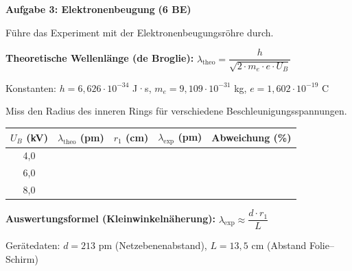 \documentclass[11pt,a4paper]{article}
\begin{document}
\vspace{0.5em}


{\large\textbf{Aufgabe 3: Elektronenbeugung}} \hfill \textbf{(6 BE)}

\vspace{0.5em}

Führe das Experiment mit der Elektronenbeugungsröhre durch.

\vspace{0.5em}

\begin{tcolorbox}[formelbox]
\textbf{Theoretische Wellenlänge (de Broglie):} \quad $\lambda_{\text{theo}} = \dfrac{h}{\sqrt{2 \cdot m_e \cdot e \cdot U_B}}$

\vspace{0.3em}
{\small Konstanten: $h = 6{,}626 \cdot 10^{-34}$ J·s, $m_e = 9{,}109 \cdot 10^{-31}$ kg, $e = 1{,}602 \cdot 10^{-19}$ C}
\end{tcolorbox}

\vspace{0.5em}

Miss den Radius des inneren Rings für verschiedene Beschleunigungsspannungen.

\vspace{0.5em}

\begin{center}
\begin{tabular}{|c|c|c|c|c|}
\hline
\rowcolor{physiklight}
$U_B$ (kV) & $\lambda_{\text{theo}}$ (pm) & $r_1$ (cm) & $\lambda_{\text{exp}}$ (pm) & Abweichung (\%) \\
\hline
4,0 & & & & \\[0.8em]
\hline
6,0 & & & & \\[0.8em]
\hline
8,0 & & & & \\[0.8em]
\hline
\end{tabular}
\end{center}

\vspace{0.5em}

\begin{tcolorbox}[formelbox]
\textbf{Auswertungsformel (Kleinwinkelnäherung):} \quad $\lambda_{\text{exp}} \approx \dfrac{d \cdot r_1}{L}$

\vspace{0.3em}
{\small Gerätedaten: $d = 213$ pm (Netzebenenabstand), $L = 13{,}5$ cm (Abstand Folie–Schirm)}
\end{tcolorbox}
\end{document}
